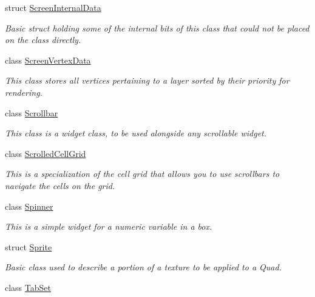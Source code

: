 \begin{DoxyCompactItemize}
struct \hyperlink{structMezzanine_1_1UI_1_1ScreenInternalData}{ScreenInternalData}
\begin{DoxyCompactList}\small\item\em Basic struct holding some of the internal bits of this class that could not be placed on the class directly. \item\end{DoxyCompactList}\item 
class \hyperlink{classMezzanine_1_1UI_1_1ScreenVertexData}{ScreenVertexData}
\begin{DoxyCompactList}\small\item\em This class stores all vertices pertaining to a layer sorted by their priority for rendering. \item\end{DoxyCompactList}\item 
class \hyperlink{classMezzanine_1_1UI_1_1Scrollbar}{Scrollbar}
\begin{DoxyCompactList}\small\item\em This class is a widget class, to be used alongside any scrollable widget. \item\end{DoxyCompactList}\item 
class \hyperlink{classMezzanine_1_1UI_1_1ScrolledCellGrid}{ScrolledCellGrid}
\begin{DoxyCompactList}\small\item\em This is a specialization of the cell grid that allows you to use scrollbars to navigate the cells on the grid. \item\end{DoxyCompactList}\item 
class \hyperlink{classMezzanine_1_1UI_1_1Spinner}{Spinner}
\begin{DoxyCompactList}\small\item\em This is a simple widget for a numeric variable in a box. \item\end{DoxyCompactList}\item 
struct \hyperlink{structMezzanine_1_1UI_1_1Sprite}{Sprite}
\begin{DoxyCompactList}\small\item\em Basic class used to describe a portion of a texture to be applied to a Quad. \item\end{DoxyCompactList}\item 
class \hyperlink{classMezzanine_1_1UI_1_1TabSet}{TabSet}

\end{DoxyCompactItemize}
